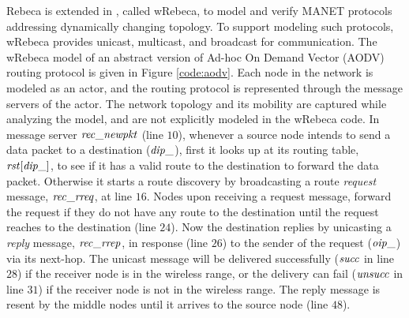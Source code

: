 Rebeca is extended in \cite{FOAC}, called wRebeca, to model and verify %
MANET protocols addressing dynamically changing topology. To support modeling such protocols, wRebeca provides unicast, multicast, and broadcast for communication. The wRebeca model of an abstract version of Ad-hoc On Demand Vector (AODV) routing protocol \cite{AODV} is given in Figure \ref{code:aodv}. Each node in the network is modeled as an actor, and the routing protocol
is represented through the message servers of the actor. The network topology and its mobility are captured while analyzing the model, and are not explicitly modeled in the wRebeca code.  
%
In message server ${\it rec\_newpkt}$ (line $10$),
whenever a source node intends to send a data packet to a destination (${\it dip\_}$), %
first it looks up at its routing table, ${\it rst}[{\it dip\_}]$, to see if it has a valid route to the destination to forward the data packet. Otherwise it starts a route discovery by broadcasting a route \emph{request} message, ${\it rec\_rreq}$, at line $16$. 
%
Nodes upon receiving a request message, forward the request if they do not have any route to the destination until the request reaches to the destination (line $24$). Now the destination replies by unicasting a \emph{reply} message, ${\it rec\_rrep}$, in response (line $26$) to the sender of the request (${\it oip\_}$) via its next-hop. The unicast message will be delivered
successfully ($\it succ$ in line $28$) if the receiver node is in the wireless range, or the
delivery can fail ($\it unsucc$ in line $31$) if the receiver node is not in the wireless range. The reply message is resent by the middle nodes until it arrives to the source node (line $48$).

\begin{figure*}
	\begin{center}
		
	\end{center}
	\caption{The AODV protocol specified by wRebeca \label{code:aodv}\cite{FOAC}}
\end{figure*} 

